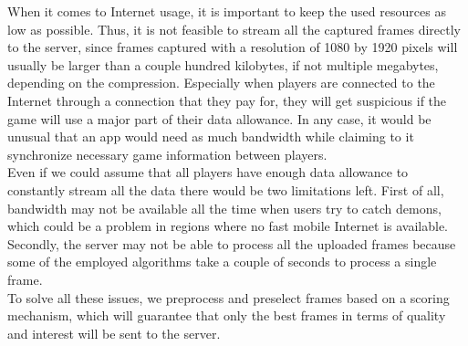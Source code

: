When it comes to Internet usage, it is important to keep the used resources as low as possible. 
Thus, it is not feasible to stream all the captured frames directly to the server, since frames captured with a resolution of 1080 by 1920 pixels will usually be larger than a couple hundred kilobytes, if not multiple megabytes, depending on the compression.
Especially when players are connected to the Internet through a connection that they pay for, they will get suspicious if the game will use a major part of their data allowance.
In any case, it would be unusual that an app would need as much bandwidth while claiming to it synchronize necessary game information between players.\\
Even if we could assume that all players have enough data allowance to constantly stream all the data there would be two limitations left.
First of all, bandwidth may not be available all the time when users try to catch demons, which could be a problem in regions where no fast mobile Internet is available.
Secondly, the server may not be able to process all the uploaded frames because some of the employed algorithms take a couple of seconds to process a single frame.\\
To solve all these issues, we preprocess and preselect frames based on a scoring mechanism, which will guarantee that only the best frames in terms of quality and interest will be sent to the server.

